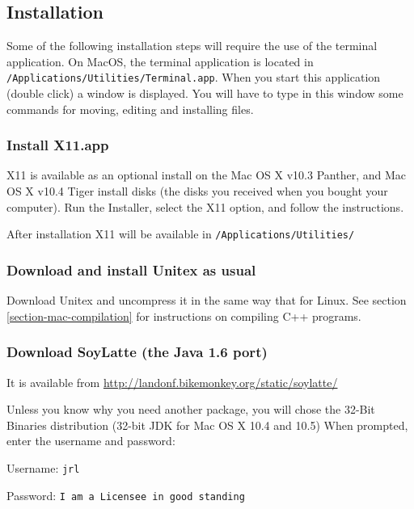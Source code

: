 \clearpage

\subsection{Installation}
\noindent Some of the following installation steps will require the use of the
terminal application. On MacOS, the terminal application is located in 
\verb+/Applications/Utilities/Terminal.app+.  When you start this application
(double click) a window is displayed. You will have to type in this window 
some commands for moving, editing and installing files.

\subsubsection{Install X11.app}
\noindent X11 is available as an optional install on the Mac OS X v10.3 
Panther, and Mac OS X v10.4 Tiger install disks (the disks you received 
when you bought your computer). Run the Installer, 
select the X11 option, and follow the instructions.

\bigskip
\noindent After installation X11 will be available in
\verb+/Applications/Utilities/+


\subsubsection{Download and install Unitex as usual}
\noindent Download Unitex and uncompress it in the same way that for Linux.
See section \ref{section-mac-compilation} for instructions on compiling
C++ programs.


\subsubsection{Download SoyLatte (the Java 1.6 port)} 
\noindent It is available from
\url{http://landonf.bikemonkey.org/static/soylatte/} 

\bigskip
\noindent Unless you know why you need another package, you will chose 
the 32-Bit Binaries distribution (32-bit JDK for Mac OS X 10.4 and 10.5) 
When prompted, enter the username and password: 

\bigskip
Username: \verb+jrl+

Password: \verb+I am a Licensee in good standing+


